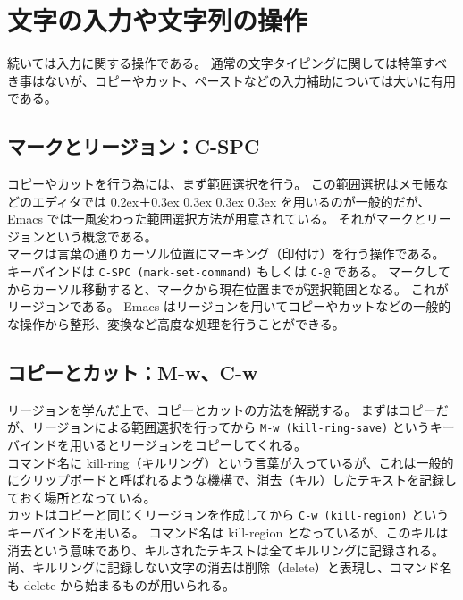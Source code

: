 \section{文字の入力や文字列の操作}
続いては入力に関する操作である。
通常の文字タイピングに関しては特筆すべき事はないが、コピーやカット、ペーストなどの入力補助については大いに有用である。
\subsection{マークとリージョン：C-SPC}
コピーやカットを行う為には、まず範囲選択を行う。
この範囲選択はメモ帳などのエディタでは \raise0.2ex\hbox{}＋\raise0.3ex\hbox{\ovalbox{\footnotesize{ $\uparrow$ }}} \raise0.3ex\hbox{\ovalbox{\footnotesize{ $\downarrow$ }}} \raise0.3ex\hbox{\ovalbox{\footnotesize{$\leftarrow$\vphantom{$\uparrow$}}}} \raise0.3ex\hbox{\ovalbox{\footnotesize{$\rightarrow$}\vphantom{$\uparrow$}}} を用いるのが一般的だが、Emacs では一風変わった範囲選択方法が用意されている。
それがマークとリージョンという概念である。\\

マークは言葉の通りカーソル位置にマーキング（印付け）を行う操作である。
キーバインドは \texttt{C-SPC (mark-set-command)} もしくは \texttt{C-@} である。
マークしてからカーソル移動すると、マークから現在位置までが選択範囲となる。
これがリージョンである。
Emacs はリージョンを用いてコピーやカットなどの一般的な操作から整形、変換など高度な処理を行うことができる。
\subsection{コピーとカット：M-w、C-w}
リージョンを学んだ上で、コピーとカットの方法を解説する。
まずはコピーだが、リージョンによる範囲選択を行ってから \texttt{M-w (kill-ring-save)} というキーバインドを用いるとリージョンをコピーしてくれる。\\

コマンド名に kill-ring（キルリング）という言葉が入っているが、これは一般的にクリップボードと呼ばれるような機構で、消去（キル）したテキストを記録しておく場所となっている。\\

カットはコピーと同じくリージョンを作成してから \texttt{C-w (kill-region)} というキーバインドを用いる。
コマンド名は kill-region となっているが、このキルは消去という意味であり、キルされたテキストは全てキルリングに記録される。
尚、キルリングに記録しない文字の消去は削除（delete）と表現し、コマンド名も delete から始まるものが用いられる。
